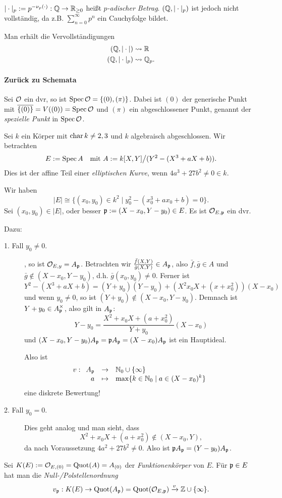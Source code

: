 $|\cdot|_p := p^{-\nu_p(\cdot)}: \mathbb{Q} \to \mathbb{R}_{\geq 0}$ heißt
\emph{$p$-adischer Betrag}.
$(\mathbb{Q}, |\cdot|_p)$ ist jedoch nicht vollständig, da
z.B. $\sum_{n=0}^\infty p^n$ ein Cauchyfolge bildet.

Man erhält die Vervollständigungen
\begin{align*}
	(\mathbb{Q}, |\cdot|) &\leadsto \mathbb{R}\\
	(\mathbb{Q}, |\cdot|_p) & \leadsto \mathbb{Q}_p.
\end{align*}

\paragraph{Zurück zu Schemata}
Sei $\mathcal{O}$ ein dvr, so ist $\operatorname{Spec} \mathcal{O} = \{(0), (\pi)\}$. Dabei ist
$(0)$ der generische Punkt mit $\overline{\{(0)\}} = V((0)) = \operatorname{Spec} \mathcal{O}$
und $(\pi)$ ein abgeschlossener Punkt, genannt der \emph{spezielle Punkt}
in $\operatorname{Spec} \mathcal{O}$.

\begin{beispiel}
	Sei $k$ ein Körper mit $\operatorname{char} k \neq 2,3$ und $k$ algebraisch 
	abgeschlossen. Wir betrachten
	\[
		E := \operatorname{Spec} A \quad \text{mit } 
			A := k[X,Y] \big/ (Y^2 - (X^3 + aX + b)).
	\]
	Dies ist der affine Teil einer \emph{elliptischen Kurve}, wenn
	$4a^3 + 27b^2 \neq 0 \in k$.
	
	Wir haben
	\[ |E| \cong \{ (x_0,y_0) \in k^2 \mid y_0^2 - (x_0^3 + ax_0 + b) = 0\}.
	\]
	Sei $(x_0,y_0) \in |E|$, oder besser $\mathfrak{p} := (X-x_0, Y - y_0) \in E$.
	Es ist $\mathcal{O}_{E,\mathfrak{p}}$ ein dvr.
	
	Dazu:
	\begin{description}
	\item[1. Fall $y_0 \neq 0$.], so ist
		$\mathcal{O}_{E,y} = A_\mathfrak{p}$. Betrachten wir
		$\frac{\bar f(X,Y)}{\bar g(X,Y)} \in A_\mathfrak{p}$, also
		$\bar f, \bar g \in A$ und $\bar g \notin (X-x_0, Y-y_0)$, d.h.
		$\bar g(x_0, y_0) \neq 0$. Ferner ist
		\[
			Y^2 - (X^3 + aX + b) = 
			(Y + y_0)(Y-y_0) + (X^2 x_0X + (x+x_0^2))(X-x_0)
		\]
		und wenn $y_0 \neq 0$, so ist
		$(Y+y_0) \notin (X-x_0, Y-y_0)$. Demnach ist
		$Y+y_0 \in A_\mathfrak{p}^\times$, also gilt in $A_\mathfrak{p}$:
		\[
			Y-y_0 = \frac{X^2 + x_0 X + (a+x_0^2)}{Y + y_0}(X-x_0)
		\]
		und
		$(X-x_0, Y-y_0) A_\mathfrak{p} = \mathfrak{p} A_\mathfrak{p} = (X-x_0)A_\mathfrak{p}$ ist 
		ein Hauptideal.
		
		Also ist
		\[
			v: \funcdef{ A_\p & \to & \N_0 \cup \{\infty\}\\
				a & \mapsto & \max\{k \in \N_0 \mid a \in (X-x_0)^k \}}
		\]
		eine diskrete Bewertung!
	\item[2. Fall $y_0 = 0$.] Dies geht analog und man sieht, dass
		\[
			X^2 + x_0 X + (a + x_0^2) \notin (X-x_0,Y),
		\]
		da nach Voraussetzung $4a^2 + 27b^2 \neq 0$. Also ist
		$\mathfrak{p} A_\mathfrak{p} = (Y - y_0) A_\mathfrak{p}$.
	\end{description} 
\end{beispiel}

\begin{bemerkung}
	Sei $K(E) := \mathcal{O}_{E,(0)} = \operatorname{Quot}(A) = A_{(0)}$ der 
	\emph{Funktionenkörper} von $E$.
	Für $\mathfrak{p} \in E$ hat man die \emph{Null-/Polstellenordnung}
	\[
		v_\mathfrak{p}: K(E) \to \operatorname{Quot}(A_\mathfrak{p}) = \operatorname{Quot}(\mathcal{O}_{E,\mathfrak{p}}) \xrightarrow v \mathbb{Z}\cup\{\infty\}.
	\]
\end{bemerkung}
\pagebreak

